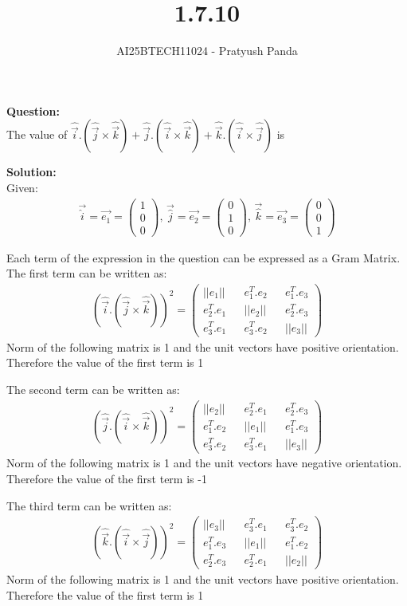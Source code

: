 \documentclass{beamer}
\title{1.7.10}
\author{AI25BTECH11024 - Pratyush Panda}
\providecommand{\brak}[1]{\ensuremath{\left(#1\right)}}
\theoremstyle{remark}
\newcommand{\myvec}[1]{\ensuremath{\begin{pmatrix}#1\end{pmatrix}}}
\numberwithin{equation}{section}
\begin{document}
\maketitle

\textbf{Question: } \\
The value of $\hat{\Vec{i}}.\brak{\hat{\Vec{j}} \times \hat{\Vec{k}}} + \hat{\Vec{j}}.\brak{\hat{\Vec{i}} \times \hat{\Vec{k}}} + \hat{\Vec{k}}.\brak{\hat{\Vec{i}} \times \hat{\Vec{j}}}$ is \underline{\hspace{2cm}}
\vspace{0.5cm}

\textbf{Solution: } \\
Given:
\begin{align}
\Vec{\hat{i}}=\Vec{e_1}=\myvec{1 \\ 0 \\ 0}, \, \Vec{\hat{j}}=\Vec{e_2}=\myvec{0 \\ 1 \\ 0}, \, \Vec{\hat{k}}=\Vec{e_3}=\myvec{0 \\ 0 \\ 1}
\end{align}

Each term of the expression in the question can be expressed as a Gram Matrix.\\
The first term can be written as:
\begin{align}
\brak{\hat{\Vec{i}}.\brak{\hat{\Vec{j}} \times \hat{\Vec{k}}}}^2 = 
\myvec{||e_1|| && e_1^T.e_2 && e_1^T.e_3 \\
       e_2^T.e_1 && ||e_2|| && e_2^T.e_3 \\
       e_3^T.e_1 && e_3^T.e_2 && ||e_3||}
\end{align}
Norm of the following matrix is 1 and the unit vectors have positive orientation. Therefore the value of the first term is 1

The second term can be written as:
\begin{align}
\brak{\hat{\Vec{j}}.\brak{\hat{\Vec{i}} \times \hat{\Vec{k}}}}^2 = 
\myvec{||e_2|| && e_2^T.e_1 && e_2^T.e_3 \\
       e_1^T.e_2 && ||e_1|| && e_1^T.e_3 \\
       e_3^T.e_2 && e_3^T.e_1 && ||e_3||}
\end{align}
Norm of the following matrix is 1 and the unit vectors have negative orientation. Therefore the value of the first term is -1

The third term can be written as:
\begin{align}
\brak{\hat{\Vec{k}}.\brak{\hat{\Vec{i}} \times \hat{\Vec{j}}}}^2 = 
\myvec{||e_3|| && e_3^T.e_1 && e_3^T.e_2 \\
       e_1^T.e_3 && ||e_1|| && e_1^T.e_2 \\
       e_2^T.e_3 && e_2^T.e_1 && ||e_2||}
\end{align}
Norm of the following matrix is 1 and the unit vectors have positive orientation. Therefore the value of the first term is 1
\end{document}

